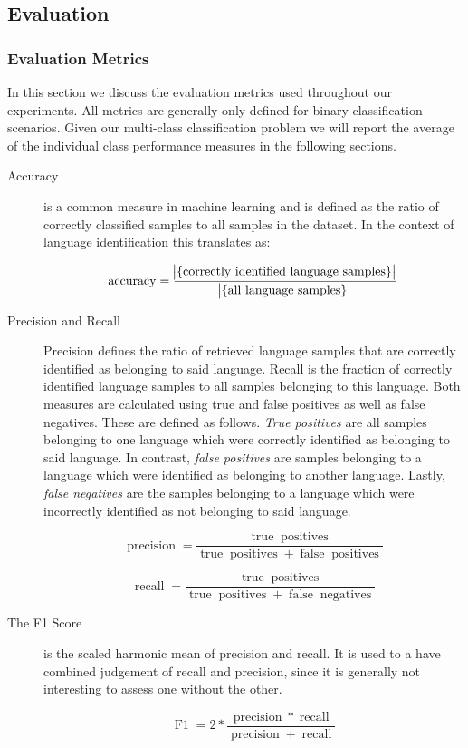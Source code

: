 \subsection{Evaluation} 

\subsubsection{Evaluation Metrics} 
\label{sec:metrics}
In this section we discuss the evaluation metrics used throughout our experiments. All metrics are generally only defined for binary classification scenarios. Given our multi-class classification problem we will report the average of the individual class performance measures in the following sections. 

\begin{description}
    \item[Accuracy] is a common measure in machine learning and is defined as the ratio of correctly classified samples to all samples in the dataset. In the context of language identification this translates as:
     
    	$$
		\operatorname{accuracy} = \frac{\abs{\{\text{correctly identified language samples}\}}}{\abs{\{\text{all language samples}\}}}
		$$
     
    
    \item[Precision and Recall] Precision defines the ratio of retrieved language samples that are correctly identified as belonging to said language. Recall is the fraction of correctly identified language samples to all samples belonging to this language. Both measures are calculated using true and false positives as well as false negatives. These are defined as follows. \textit{True positives} are all samples belonging to one language which were correctly identified as belonging to said language. In contrast, \textit{false positives} are samples belonging to a language which were identified as belonging to another language. Lastly, \textit{false negatives} are the samples belonging to a language which were incorrectly identified as not belonging to said language.

	    $$
	    \operatorname{precision} = \frac
	      {\operatorname{true} \operatorname{positives}}
	      {\operatorname{true} \operatorname{positives} + \operatorname{false} \operatorname{positives}}
	    $$
		
		$$
		\operatorname{recall} = \frac
			{\operatorname{true} \operatorname{positives}}
			{\operatorname{true} \operatorname{positives} + \operatorname{false} \operatorname{negatives}}
		$$    


    \item[The F1 Score] is the scaled harmonic mean of precision and recall. It is used to a have combined judgement of recall and precision, since it is generally not interesting to assess one without the other.
    
    	$$
    	\operatorname{F1} = 2 * \frac{\operatorname{precision} * \operatorname{recall}}{\operatorname{precision} + \operatorname{recall}}
    	$$

\end{description}


